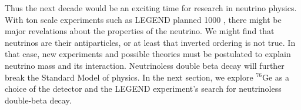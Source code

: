 Thus the next decade would be an exciting time for research in neutrino physics. With ton scale experiments such as LEGEND planned 1000 \cite{legend2017}, there might be major revelations about the properties of the neutrino. We might find that neutrinos are their antiparticles, or at least that inverted ordering is not true. In that case, new experiments and possible theories must be postulated to explain neutrino mass and its interaction. Neutrinoless double beta decay will further break the Standard Model of physics. In the next section, we explore ${}^{76}\mathrm{Ge}$ as a choice of the detector and the LEGEND experiment's search for neutrinoless double-beta decay.


